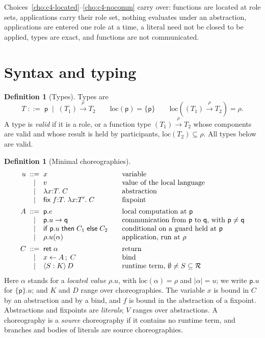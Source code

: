 \documentclass[11pt]{report}
\theoremstyle{plain}
\theoremstyle{definition}
\newtheorem{definition}[theorem]{Definition}
\theoremstyle{remark}
\newcommand{\kw}[1]{\mathsf{#1}}
\newcommand{\pp}{\mathsf{p}}
\newcommand{\qq}{\mathsf{q}}
\newcommand{\Roles}{\mathcal{R}}
\newcommand{\bind}[3]{#1 \leftarrow #2\,;\;#3}
\newcommand{\cret}[1]{\kw{ret}\;#1}
\newcommand{\com}[3]{#1.#2 \to #3}
\newcommand{\cif}[4]{\kw{if}\;#1.#2\;\kw{then}\;#3\;\kw{else}\;#4}
\newcommand{\rt}[3]{\langle #1 : #2\rangle\,#3}
\newcommand{\loc}[1]{\mathrm{loc}(#1)}
\newcommand{\pay}[1]{\lvert #1\rvert}
\newcommand{\farr}[3]{(#1) \xrightarrow{#2} #3}
\newcommand{\clam}[3]{\lambda #1{:}#2.\;#3}
\newcommand{\cfix}[3]{\kw{fix}\;#1{:}#2.\;#3}
\begin{document}
Choices~\ref{cho:c4-located}--\ref{cho:c4-nocomm} carry over: functions are
located at role sets, applications carry their role set, nothing evaluates
under an abstraction, applications are entered one role at a time, a literal
need not be closed to be applied, types are exact, and functions are not
communicated.

\section{Syntax and typing}
\label{sec:c5-syntax}

\begin{definition}[Types]\label{def:c5-types}
  Types are
  \[
    T \;::=\; \pp \;\mid\; \farr{T_1}{\rho}{T_2}
    \qquad
    \loc{\pp}=\{\pp\}
    \qquad
    \loc{\farr{T_1}{\rho}{T_2}}=\rho.
  \]
  A type is \emph{valid} if it is a role, or a function type
  $\farr{T_1}{\rho}{T_2}$ whose components are valid and whose result is
  held by participants, $\loc{T_2}\subseteq\rho$.  All types below are
  valid.
\end{definition}

\begin{definition}[Minimal choreographies]\label{def:c5-syntax}
  \[
  \begin{array}{r@{\;\;}c@{\;\;}l@{\qquad}l}
    u & ::= & x & \text{variable}\\
      & \mid & v & \text{value of the local language}\\
      & \mid & \clam{x}{T}{C} & \text{abstraction}\\
      & \mid & \cfix{f}{T}{\clam{x}{T'}{C}} & \text{fixpoint}\\[1ex]
    A & ::= & \pp.e & \text{local computation at } \pp\\
      & \mid & \com{\pp}{u}{\qq} & \text{communication from $\pp$ to $\qq$, with } \pp\neq\qq\\
      & \mid & \cif{\pp}{u}{C_1}{C_2} & \text{conditional on a guard held at } \pp\\
      & \mid & \rho.u(\alpha) & \text{application, run at } \rho\\[1ex]
    C & ::= & \cret{\alpha} & \text{return}\\
      & \mid & \bind{x}{A}{C} & \text{bind}\\
      & \mid & \rt{S}{K}{D} & \text{runtime term, } \emptyset\neq S\subseteq\Roles
  \end{array}
  \]
  Here $\alpha$ stands for a \emph{located value} $\rho.u$, with
  $\loc{\alpha}=\rho$ and $\pay{\alpha}=u$; we write $\pp.u$ for
  $\{\pp\}.u$; and $K$ and $D$ range over choreographies.  The variable $x$
  is bound in $C$ by an abstraction and by a bind, and $f$ is bound in the
  abstraction of a fixpoint.  Abstractions and fixpoints are
  \emph{literals}; $V$ ranges over abstractions.  A choreography is a
  \emph{source} choreography if it contains no runtime term, and branches
  and bodies of literals are source choreographies.
\end{definition}
\end{document}
